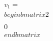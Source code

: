 \documentclass[preview]{standalone}
\begin{document}
\begin{align*}
v_1 = \\begin{bmatrix} 2 \\\\ 0 \\end{bmatrix}
\end{align*}
\end{document}
